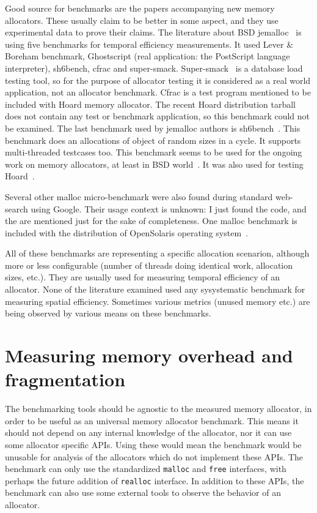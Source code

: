 Good source for benchmarks are the papers accompanying new memory allocators. These usually claim to be better in some aspect, and they use experimental data to prove their claims. The literature about BSD jemalloc~\cite{allocators:jemalloc, allocators:jemalloc:42} is using five benchmarks for temporal efficiency measurements. It used Lever \& Boreham benchmark, Ghostscript (real application: the PostScript language interpreter), sh6bench, cfrac and super-smack. Super-smack~\cite{super-smack} is a database load testing tool, so for the purpose of allocator testing it is considered as a real world application, not an allocator benchmark. Cfrac is a test program mentioned to be included with Hoard memory allocator. The recent Hoard distribution tarball does not contain any test or benchmark application, so this benchmark could not be examined. The last benchmark used by jemalloc authors is sh6bench~\cite{sh6bench}. This benchmark does an allocations of object of random sizes in a cycle. It supports multi-threaded testcases too. This benchmark seems to be used for the ongoing work on memory allocators, at least in BSD world~\cite{dragonfly-malloc}. It was also used for testing Hoard~\cite{allocators:hoard}.

Several other malloc micro-benchmark were also found during standard web-search using Google. Their usage context is unknown: I just found the code, and the are mentioned just for the sake of completeness. One malloc benchmark is included with the distribution of OpenSolaris operating system~\cite{solaris-benchmark}.

All of these benchmarks are representing a specific allocation scenarion, although more or less configurable (number of threads doing identical work, allocation sizes, etc.). They are usually used for measuring temporal efficiency of an allocator. None of the literature examined used any sysystematic benchmark for measuring spatial efficiency. Sometimes various metrics (unused memory etc.) are being observed by various means on these benchmarks.

\section{Measuring memory overhead and fragmentation}
\label{methodology:fragmentation}

The benchmarking tools should be agnostic to the measured memory allocator, in
order to be useful as an universal memory allocator benchmark. This means it
should not depend on any internal knowledge of the allocator, nor it can use some
allocator specific APIs. Using these would mean the benchmark would be unusable
for analysis of the allocators which do not implement these APIs. The benchmark
can only use the standardized {\tt malloc} and {\tt free} interfaces, with
perhaps the future addition of {\tt realloc} interface. In addition to these
APIs, the benchmark can also use some external tools to observe the behavior of
an allocator.

